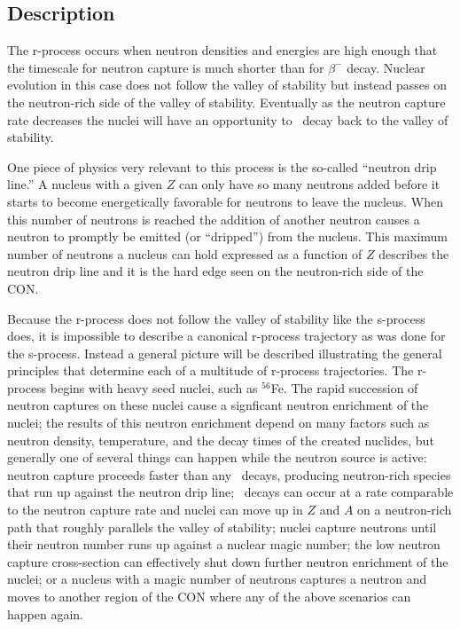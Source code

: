 \label{sec:r}
\subsection{Description}

The r-process occurs when neutron
densities and energies are high enough that the timescale for
neutron capture is much shorter than for $\beta^-$ decay.  Nuclear
evolution in this case does not follow the valley of stability but
instead passes on the neutron-rich side of the valley of stability.
Eventually as the neutron capture rate decreases the nuclei will have
an opportunity to \bminus\ decay back to the valley of stability.

One piece of physics very relevant to this process is the so-called
``neutron drip line.''  A nucleus with a given $Z$ can only have so
many neutrons added before it starts to become energetically favorable
for neutrons to leave the nucleus.  When this number of neutrons is
reached the addition of another neutron causes a
neutron to promptly be emitted (or ``dripped'') from the nucleus.
This maximum number of neutrons a nucleus can hold expressed as a
function of $Z$ describes the neutron drip line and it is the hard
edge seen on the neutron-rich side of the CON.

Because the r-process does not follow the valley of stability like the
s-process does, it is impossible to describe a canonical r-process
trajectory as was done for the s-process.  Instead a general picture
will be described illustrating the general principles that determine
each of a multitude of r-process trajectories.  The r-process begins 
with heavy seed nuclei, such as $^{56}$Fe.  The
rapid succession of neutron captures on these nuclei cause a
signficant neutron enrichment of the nuclei; the results of this
neutron enrichment depend on many factors such as neutron density,
temperature, and the decay times of the created nuclides, but
generally one of several things can happen while the neutron source is
active: neutron capture proceeds
faster than any \bminus\ decays, producing neutron-rich species that
run up against the neutron drip line; \bminus\ decays can occur at a
rate comparable to the neutron capture rate and nuclei can move up in
$Z$ and $A$ on a neutron-rich path that roughly parallels the valley 
of stability; nuclei capture neutrons until their neutron number 
runs up against a nuclear magic number; the low neutron capture
cross-section can effectively shut down further neutron enrichment of
the nuclei; or a nucleus with a magic number of neutrons captures a
neutron and moves to another region of the CON where any of the above
scenarios can happen again.

